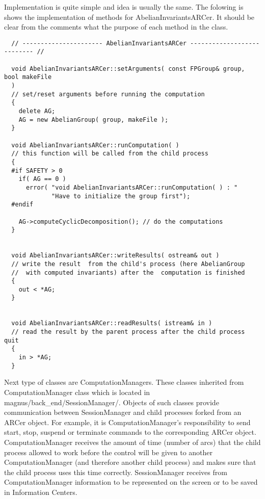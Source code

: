 \documentclass[12pt]{article}
\begin{document}
 Implementation is quite simple and idea
   is usually the same. The folowing is shows the implementation of methods 
  for 
  AbelianInvariantsARCer. It should be clear from the  comments what the purpose 
  of
  each method in the class. 


  \scriptsize
  \begin{verbatim}
  // ---------------------- AbelianInvariantsARCer --------------------------- //

  void AbelianInvariantsARCer::setArguments( const FPGroup& group,   bool makeFile 
  )
  // set/reset arguments before running the computation 
  {
    delete AG;
    AG = new AbelianGroup( group, makeFile );
  }

  void AbelianInvariantsARCer::runComputation( )
  // this function will be called from the child process
  {
  #if SAFETY > 0
    if( AG == 0 )
      error( "void AbelianInvariantsARCer::runComputation( ) : "
             "Have to initialize the group first");
  #endif

    AG->computeCyclicDecomposition(); // do the computations
  }


  void AbelianInvariantsARCer::writeResults( ostream& out ) 
  // write the result  from the child's process (here AbelianGroup
  //  with computed invariants) after the  computation is finished 
  {
    out < *AG;
  }


  void AbelianInvariantsARCer::readResults( istream& in )
  // read the result by the parent process after the child process quit
  {
    in > *AG;
  }
  \end{verbatim}
  \normalsize


          Next type of classes are  ComputationManagers. These classes inherited 
  from 
  ComputationManager class which  is located in magnus/back\_end/SessionManager/.
  Objects of such classes provide communication between SessionManager and child 
  processes
   forked from an ARCer object. 
  For example, it is ComputationManager's responsibility to send
   start, stop, suspend or terminate commands to the corresponding ARCer object. 
  ComputationManager receives the amount of time (number of arcs) that the child 
  process
   allowed to work before the control will be given to another ComputationManager 
  (and 
  therefore another child process) and makes sure that the child process uses this 
  time
   correctly. SessionManager receives from ComputationManager information to be 
  represented
   on the screen or to be saved in Information Centers.
          
\end{document}

